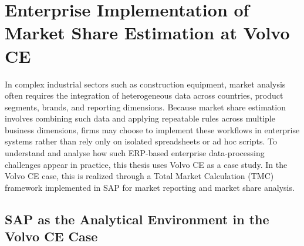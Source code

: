 


\section{Enterprise Implementation of Market Share Estimation at Volvo CE}
\label{subsec:enterprise_tmc_volvo}

In complex industrial sectors such as construction equipment, market analysis often requires the integration of heterogeneous data across countries, product segments, brands, and reporting dimensions. Because market share estimation involves combining such data and applying repeatable rules across multiple business dimensions, firms may choose to implement these workflows in enterprise systems rather than rely only on isolated spreadsheets or ad hoc scripts. To understand and analyse how such ERP-based enterprise data-processing challenges appear in practice, this thesis uses Volvo CE as a case study. In the Volvo CE case, this is realized through a Total Market Calculation (TMC) framework implemented in SAP for market reporting and market share analysis.




\subsection{SAP as the Analytical Environment in the Volvo CE Case}

